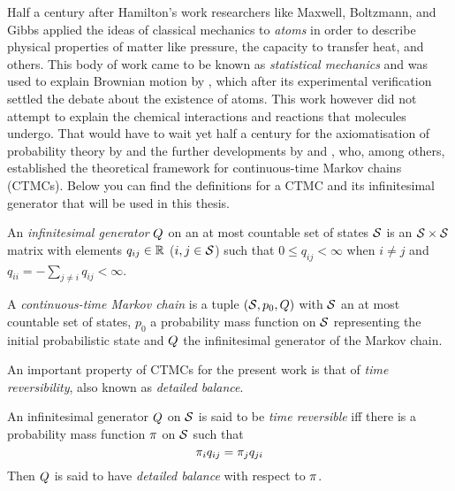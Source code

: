 Half a century after Hamilton's work
researchers like Maxwell, Boltzmann, and Gibbs %
applied the ideas of classical mechanics to \emph{atoms}
in order to describe physical properties of matter like pressure,
the capacity to transfer heat, and others.
This body of work came to be known as \emph{statistical mechanics}
and was used to explain Brownian motion by \citet{einstein-brownian},
which after its experimental verification \citep{perrin}
settled the debate about the existence of atoms.
This work however did not attempt to explain
the chemical interactions and reactions that molecules undergo.
That would have to wait yet half a century
for the axiomatisation of probability theory by \citet{kolmogorov}
and the further developments by \citet{doob} and \citet{feller},
who, among others, established the theoretical framework
for continuous-time Markov chains (CTMCs).
Below you can find the definitions for a CTMC
and its infinitesimal generator that will be used in this thesis.

\begin{definition}
  An \emph{infinitesimal generator} $Q$
  on an at most countable set of states $\mathcal{S}$
  is an $\mathcal{S} \times \mathcal{S}$ matrix
  with elements $q_{ij} \in \mathbb{R}$ ($i,j \in \mathcal{S}$)
  such that $0 \leqslant q_{ij} < \infty$ when $i \neq j$
  and $q_{ii} = - \sum_{j \neq i} q_{ij} < \infty$.
\end{definition}

\begin{definition}[CTMC]%
  A \emph{continuous-time Markov chain} is a tuple
  $\left(\mathcal{S}, p_0, Q\right)$ with
  $\mathcal{S}$ an at most countable set of states,
  $p_0$ a probability mass function on $\mathcal{S}$
  representing the initial probabilistic state and
  $Q$ the infinitesimal generator of the Markov chain.
\end{definition}


An important property of CTMCs for the present work is that of
\emph{time reversibility}, also known as \emph{detailed balance}.

\begin{definition}
  An infinitesimal generator $Q$ on $\mathcal{S}$
  is said to be \emph{time reversible} iff
  there is a probability mass function $\pi$ on $\mathcal{S}$ such that
  \begin{equation}
    \label{eq:detailed-balance}
    \pi_i q_{ij} = \pi_j q_{ji}
  \end{equation}
  Then $Q$ is said to have \emph{detailed balance}
  with respect to $\pi$.
\end{definition}

